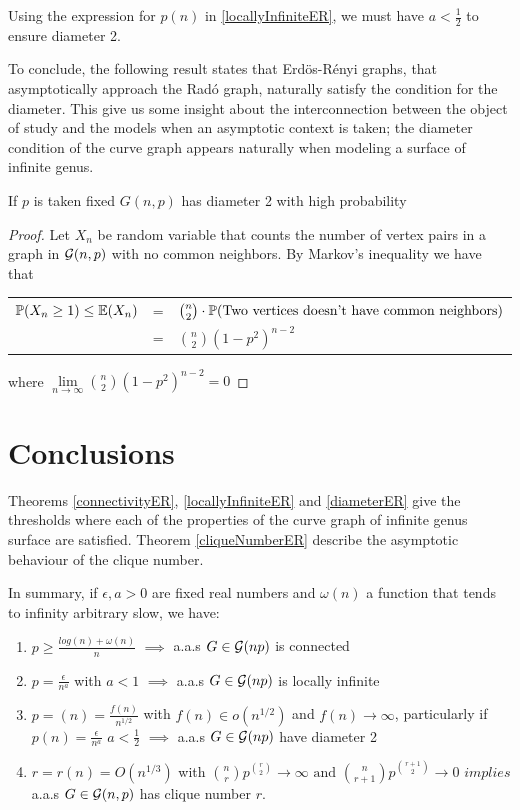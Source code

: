 Using the expression for $p(n)$ in \ref{locallyInfiniteER}, we must have $a<\frac{1}{2}$ to ensure diameter 2.

To conclude, the following result states that Erdös-Rényi graphs, that asymptotically approach the Radó graph, naturally satisfy the condition for the diameter. This give us some insight about the interconnection between the object of study and the models when an asymptotic context is taken; the diameter condition of the curve graph appears naturally when modeling a surface of infinite genus.

\begin{theorem}
If $p$ is taken fixed $G(n,p)$ has diameter 2 with high probability 
\end{theorem}

\begin{proof}
Let $X_{n}$ be random variable that counts the number of vertex pairs in a graph in $\G(n,p)$ with no common neighbors. By Markov's inequality we have that
\begin{center}
\begin{tabular}{ r c l }
 $\P(X_{n} \geq 1)\leq \E(X_{n})$ & = & $\binom{n}{2} \cdot \P(\text{Two vertices doesn't have common neighbors})$ \\
 & = & $\binom{n}{2} (1-p^{2})^{n-2}$
\end{tabular}
\end{center}
where $\lim\limits_{n \to \infty}\binom{n}{2} (1-p^{2})^{n-2} = 0$
\end{proof}

\section{Conclusions}

Theorems \ref{connectivityER}, \ref{locallyInfiniteER} and \ref{diameterER} give the thresholds where each of the properties of the curve graph of infinite genus surface are satisfied. Theorem \ref{cliqueNumberER} describe the asymptotic behaviour of the clique number.

In summary, if $\epsilon, a > 0$ are fixed real numbers and $\omega(n)$ a function that tends to infinity arbitrary slow, we have:
\begin{enumerate}
    \item $p\geq \frac{log(n)+ \omega(n)}{n}$ $\implies$ a.a.s $G\in\G(np)$ is connected
    \item $p=\frac{\epsilon}{n^{a}}$ with $a<1$ $\implies$ a.a.s $G\in\G(np)$ is locally infinite
    \item $p=(n) = \frac{f(n)}{n^{1/2}}$ with $f(n)\in o(n^{1/2})$ and $f(n)\to \infty$, particularly if $p(n)=\frac{\epsilon}{n^{a}}$ $a<\frac{1}{2}$ $\implies$ a.a.s  $G\in\G(np)$ have diameter 2
    \item $r = r(n) = O(n^{1/3})$ with $\binom{n}{r} p^{\binom{r}{2}} \to \infty \text{ and } \binom{n}{r+1} p^{\binom{r+1}{2}} \to 0 $ $implies$ a.a.s $G\in\G(n,p)$ has clique number $r$.
\end{enumerate}

